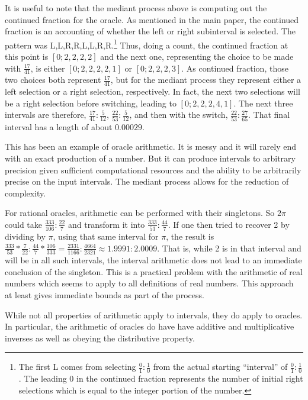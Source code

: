 \documentclass[12pt]{article}
\theoremstyle{remark}
\begin{document}
It is useful to note that the mediant process above is computing out the continued fraction for the oracle. As mentioned in the main paper, the continued fraction is an accounting of whether the left or right subinterval is selected. The pattern was L,L,R,R,L,L,R,R.\footnote{The first L comes from selecting $\frac{0}{1}: \frac{1}{0}$ from the actual starting ``interval'' of $\frac{0}{1}: \frac{1}{0}$. The leading 0 in the continued fraction represents the number of initial right selections which is equal to the integer portion of the number.} Thus, doing a count, the continued fraction at this point is $[0;2,2,2,2]$ and the next one, representing the choice to be made with $\frac{17}{41}$, is either $[0;2,2,2,2,1]$ or $[0;2,2,2,3]$. As continued fraction, those two choices both represent $\frac{17}{41}$, but for the mediant process they represent either a left selection or a right selection, respectively. In fact, the next two selections will be a right selection before switching, leading to $[0;2,2,2,4,1]$. The next three intervals are therefore, $\frac{17}{41}: \frac{5}{12}$, $\frac{22}{53}: \frac{5}{12}$, and then with the switch, $\frac{22}{53}: \frac{27}{65}$. That final interval has a length of about $0.00029$. 

This has been an example of oracle arithmetic. It is messy and it will rarely end with an exact production of a number. But it can produce intervals to arbitrary precision given sufficient computational resources and the ability to be arbitrarily precise on the input intervals. The mediant process allows for the reduction of complexity. 

For rational oracles, arithmetic can be performed with their singletons. So $2 \pi$ could take $\frac{333}{106}: \frac{22}{7}$ and transform it into $\frac{333}{53}: \frac{44}{7}$. If one then tried to recover 2 by dividing  by $\pi$, using that same interval for $\pi$, the result is $\frac{333}{53} * \frac{7}{22}: \frac{44}{7} * \frac{106}{333} = \frac{2331}{1166}: \frac{4664}{2321} \approx 1.9991: 2.0009$. That is, while 2 is in that interval and will be in all such intervals, the interval arithmetic does not lead to an immediate conclusion of the singleton. This is a practical problem with the arithmetic of real numbers which seems to apply to all definitions of real numbers. This approach at least gives immediate bounds as part of the process.

While not all properties of arithmetic apply to intervals, they do apply to oracles. In particular, the arithmetic of oracles do have have additive and multiplicative inverses as well as obeying the distributive property.
\end{document}
